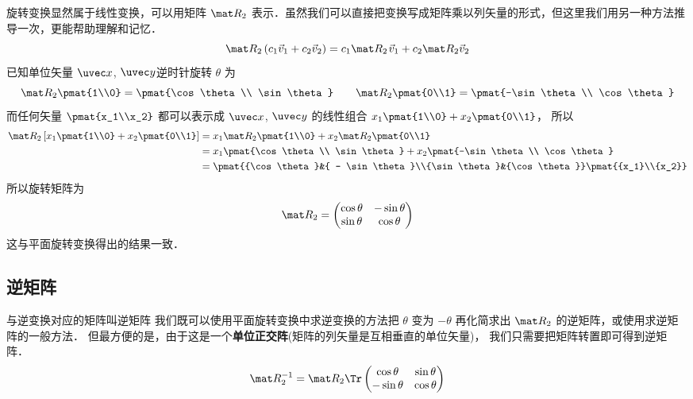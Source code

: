 旋转变换显然属于线性变换，可以用矩阵 $\mat R_2$ 表示．虽然我们可以直接把变换写成矩阵乘以列矢量的形式，但这里我们用另一种方法推导一次，更能帮助理解和记忆．
\begin{equation}
\mat R_2\left( {{c_1}{{\vec v}_1} + {c_2}{{\vec v}_2}} \right) = {c_1}\mat R_2{\kern 1pt} {\vec v_1} + {c_2}\mat R_2 {\vec v_2} 
\end{equation}
已知单位矢量 $\uvec x$, $\uvec y$逆时针旋转 $\theta$ 为
\begin{equation}
\mat R_2\pmat{1\\0} = \pmat{\cos \theta \\ \sin \theta}
\qquad
\mat R_2\pmat{0\\1} = \pmat{-\sin\theta \\ \cos\theta}
\end{equation}
而任何矢量 $\pmat{x_1\\x_2}$ 都可以表示成 $\uvec x$, $\uvec y$ 的线性组合 ${x_1}\pmat{1\\0} + {x_2}\pmat{0\\1}$， 所以
\begin{equation}\begin{split}
\mat R_2\left[x_1 \pmat{1\\0} + x_2 \pmat{0\\1} \right] 
&= x_1 \mat R_2\pmat{1\\0} + x_2 \mat R_2\pmat{0\\1}\\
&= x_1\pmat{\cos \theta \\ \sin \theta} 
  + x_2 \pmat{-\sin\theta \\ \cos\theta} \\
&= \pmat{{\cos \theta }&{ - \sin \theta }\\{\sin \theta }&{\cos \theta }}
\pmat{{x_1}\\{x_2}}
\end{split}\end{equation}
所以旋转矩阵为
\begin{equation}
\mat R_2 = \begin{pmatrix}
{\cos\theta }&{ - \sin\theta }\\
{\sin\theta }&{\cos\theta }
\end{pmatrix}
\end{equation}
这与平面旋转变换得出的结果一致．
\subsection{逆矩阵}
与逆变换对应的矩阵叫逆矩阵%
我们既可以使用平面旋转变换中求逆变换的方法把 $\theta$ 变为 $-\theta$ 再化简求出 $\mat R_2$ 的逆矩阵，或使用求逆矩阵的一般方法．%
但最方便的是，由于这是一个\textbf{单位正交阵}(矩阵的列矢量是互相垂直的单位矢量)，%
我们只需要把矩阵转置即可得到逆矩阵．
\begin{equation}
\mat R_2^{-1} = \mat R_2\Tr \begin{pmatrix}
{\cos\theta }&{\sin\theta }\\
{-\sin\theta }&{\cos\theta }
\end{pmatrix}
\end{equation}


